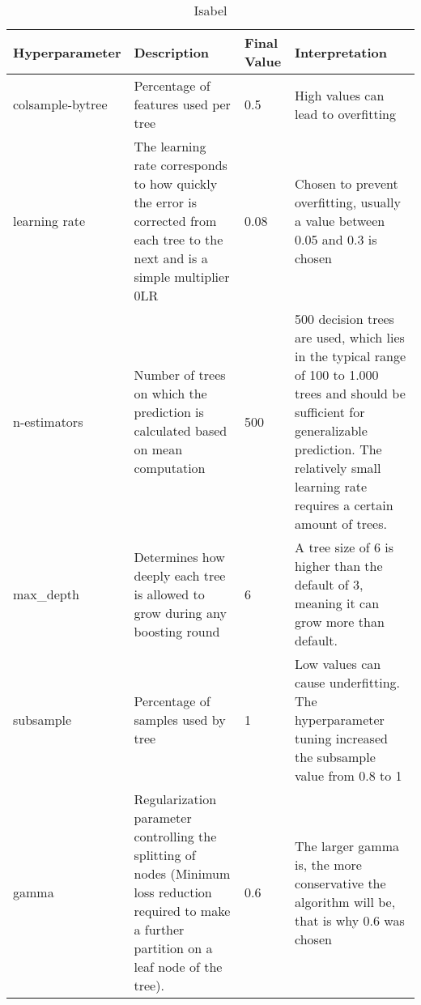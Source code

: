 \begin{table}[H]
\begin{tabular}{p{}p{}p{}p{}}
    \toprule
    \textbf{Hyperparameter} & \textbf{Description }  & \textbf{Final Value} & \textbf{Interpretation} \\
    \midrule
    colsample-bytree & Percentage of features used per tree & 0.5 & High values can lead to overfitting\\
    \hline
    learning rate & The learning rate corresponds to how quickly the error is corrected from each tree to the next and is a simple multiplier 0\<LR\≤1 & 0.08 & Chosen to prevent overfitting, usually a value between 0.05 and 0.3 is chosen\\
    \hline
    n-estimators  & Number of trees on which the prediction is calculated based on mean computation & 500 & 500 decision trees are used, which lies in the typical range of 100 to 1.000 trees and should be sufficient for generalizable prediction. The relatively small learning rate requires a certain amount of trees.\\
    \hline
    max_depth & Determines how deeply each tree is allowed to grow during any boosting round & 6 & A tree size of 6 is higher than the default of 3, meaning it  can grow more than default.\\
    \hline
    subsample & Percentage of samples used by tree & 1 & Low values can cause underfitting. The hyperparameter tuning increased the subsample value from 0.8 to 1 \\
     \hline
     gamma & Regularization parameter controlling the splitting of nodes (Minimum loss reduction required to make a further partition on a leaf node of the tree). & 0.6 & The larger gamma is, the more conservative the algorithm will be, that is why 0.6 was chosen\\
 
    \bottomrule
\end{tabular}
\caption{\label{table:isabel}Isabel}
\end{table}
